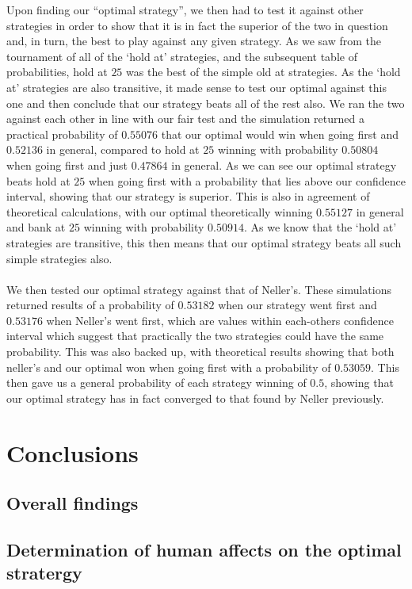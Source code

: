 \documentclass[a4paper,titlepage]{article}
\begin{document}
Upon finding our ``optimal strategy'', we then had to test it against other strategies in order to show that it is in fact the superior of the two in question and, in turn, the best to play against any given strategy. As we saw from the tournament of all of the ‘hold at’ strategies, and the subsequent table of probabilities, hold at $25$ was the best of the simple old at strategies. As the ‘hold at’ strategies are also transitive, it made sense to test our optimal against this one and then conclude that our strategy beats all of the rest also. We ran the two against each other in line with our fair test and the simulation returned a practical probability of $0.55076$ that our optimal would win when going first and $0.52136$ in general, compared to hold at $25$ winning with probability $0.50804$ when going first and just $0.47864$ in general. As we can see our optimal strategy beats hold at $25$ when going first with a probability that lies above our confidence interval, showing that our strategy is superior. This is also in agreement of theoretical calculations, with our optimal theoretically winning $0.55127$ in general and bank at $25$ winning with probability $0.50914$. As we know that the ‘hold at’ strategies are transitive, this then means that our optimal strategy beats all such simple strategies also.\\ \\
We then tested our optimal strategy against that of Neller’s. These simulations returned results of a probability of $0.53182$ when our strategy went first and $0.53176$ when Neller’s went first, which are values within each-others confidence interval which suggest that practically the two strategies could have the same probability. This was also backed up, with theoretical results showing that both neller’s and our optimal won when going first with a probability of $0.53059$. This then gave us a general probability of each strategy winning of $0.5$, showing that our optimal strategy has in fact converged to that found by Neller previously.

\section{Conclusions}
\subsection{Overall findings}
\subsection{Determination of human affects on the optimal stratergy}
\end{document}
